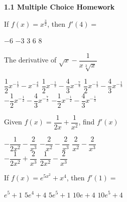 \documentclass[11pt]{exam}
\newcommand{\horizontalline}{\noindent\makebox[\linewidth]{\rule{\textwidth}{1pt}}}
\begin{document}
\textbf{\large{1.1 Multiple Choice Homework}} \par

\begin{questions}
    \question If $f(x) = x^\frac{3}{2}$, then $f'(4) =$ \\
    
    \begin{oneparchoices}
        \choice $-6$ 
        \choice $-3$ 
        \choice $3$
        \choice $6$
        \choice $8$
    \end{oneparchoices} \par \horizontalline

    \question The derivative of $\sqrt x - \dfrac{1}{x\sqrt[3]{x}}$ \\

    \begin{oneparchoices}
        \choice $\dfrac{1}{2}x^{-\frac{1}{2}} - x^{-\frac{4}{3}}$
        \choice $\dfrac{1}{2}x^{-\frac{1}{2}} - \dfrac{4}{3}x^{-\frac{7}{3}}$ 
        \choice $\dfrac{1}{2}x^{-\frac{1}{2}} - \dfrac{4}{3}x^{-\frac{1}{3}}$ \\[11pt]
        \makebox[0.2 \textwidth] \choice $-\dfrac{1}{2}x^{-\frac{1}{2}} - \dfrac{4}{3}x^{-\frac{7}{3}}$ 
        \makebox[0.25 \textwidth] \choice $-\dfrac{1}{2}x^{-\frac{1}{2}} - \dfrac{4}{3}x^{-\frac{1}{3}}$
    \end{oneparchoices} \par \horizontalline

    \question Given $f(x) = \dfrac{1}{2x} + \dfrac{1}{x^2}$, find $f'(x)$ \\

    \begin{oneparchoices}
        \choice $-\dfrac{1}{2x^2} - \dfrac{2}{x^3}$ 
        \choice $-\dfrac{2}{x^2} - \dfrac{2}{x^3}$
        \choice $\dfrac{2}{x^2} - \dfrac{2}{x^3}$ \\
        \makebox[0.23 \textwidth] \choice $-\dfrac{1}{2x^2} + \dfrac{2}{x^3}$
        \makebox[0.29 \textwidth] \choice $\dfrac{1}{2x^2} - \dfrac{2}{x^3}$
    \end{oneparchoices} \par \horizontalline

    \question If $f(x) = e^{5x^2} + x^4$, then $f'(1)=$ \\

    \begin{oneparchoices}
        \choice $e^5 + 1$
        \choice $5e^4 + 4$ 
        \choice $5e^5 + 1$
        \choice $10e + 4$
        \choice $10e^5 + 4$
    \end{oneparchoices} \par \horizontalline


\end{questions}
\end{document}
